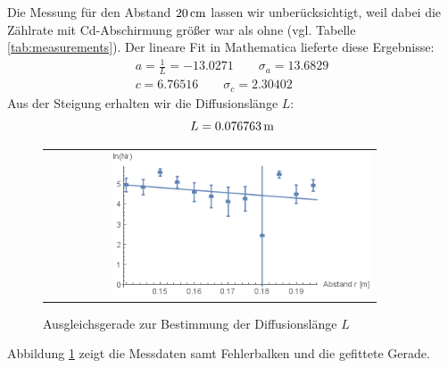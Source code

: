 \documentclass[a4paper,titlepage]{scrartcl}
\numberwithin{equation}{section}
\begin{document}
Die Messung für den Abstand $\unit[20]{cm}$ lassen wir unberücksichtigt, weil dabei die Zählrate mit Cd-Abschirmung größer war als ohne (vgl. Tabelle \ref{tab:measurements}).
Der lineare Fit in Mathematica lieferte diese Ergebnisse:
\begin{eqnarray*}
a=\frac{1}{L}=-13.0271 \quad \quad \sigma_a=13.6829\\
c=6.76516 \quad \quad \sigma_c=2.30402
\end{eqnarray*}
Aus der Steigung erhalten wir die Diffusionslänge $L$:
\begin{equation*}
L=\unit[0.076763]{m}
\end{equation*}
\begin{figure}[H]
	\centering
	\begin{tabular}{@{}r@{}}
		\includegraphics[width=0.8\textwidth]{images/diffusion.png}
	\end{tabular}
	\caption{Ausgleichsgerade zur Bestimmung der Diffusionslänge $L$}
    \label{fig:diffusionsGerade}
\end{figure}
Abbildung \ref{fig:diffusionsGerade} zeigt die Messdaten samt Fehlerbalken und die gefittete Gerade.
\end{document}
